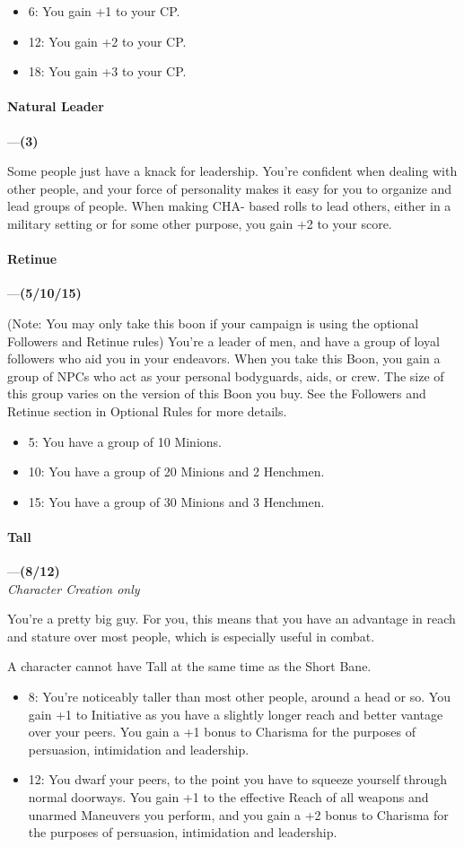 \documentclass[oneside,11pt,english]{book}
\begin{document}
 
\begin{itemize}
\item 6: You gain +1 to your CP. 
\item 12: You gain +2 to your CP. 
\item 18: You gain +3 to your CP. 
\end{itemize}
\paragraph{\label{boon:Natural Leader}Natural Leader}---\quad\textbf{(3) }\par
Some people just have a knack for leadership. You're confident when dealing with other people, and your 
force of personality makes it easy for you to organize and lead groups of people. When making CHA-
based rolls to lead others, either in a military setting or for some other purpose, you gain +2 to your score. 
\paragraph{\label{boon:Retinue}Retinue}---\quad\textbf{(5/10/15) }\par
(Note: You may only take this boon if your campaign is using the optional Followers and Retinue rules) 
You're a leader of men, and have a group of loyal followers who aid you in your endeavors. When you 
take this Boon, you gain a group of NPCs who act as your personal bodyguards, aids, or crew. The size of 
this group varies on the version of this Boon you buy. See the Followers and Retinue section in 
Optional Rules for more details. 
\begin{itemize}
\item 5: You have a group of 10 Minions. 
\item 10: You have a group of 20 Minions and 2 Henchmen. 
\item 15: You have a group of 30 Minions and 3 Henchmen. 
\end{itemize}
\paragraph{\label{boon:Tall}Tall}---\quad\textbf{(8/12) }\\
\textit{Character Creation only}\par
You're a pretty big guy. For you, this means that you have an advantage in reach and stature over most 
people, which is especially useful in combat. 


A character cannot have Tall at the same time as the Short Bane. 
\begin{itemize}
\item 8: You’re noticeably taller than most other people, around a head or so. 
You gain +1 to Initiative as you have a slightly longer reach and better vantage over your peers. You gain a +1 bonus to Charisma for the purposes of persuasion, intimidation and leadership.
\item 12: You dwarf your peers, to the point you have to squeeze yourself through normal doorways. You gain +1 to the effective Reach of all weapons and unarmed Maneuvers you perform, and you gain a +2 bonus to Charisma for the purposes of persuasion, intimidation and leadership.
\end{itemize}
\end{document}
